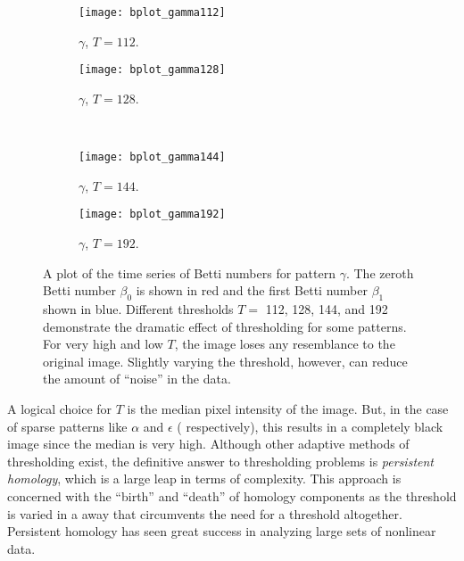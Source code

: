 \begin{figure*}[h]
	\centering
	\begin{subfigure}[b]{0.48\textwidth}
                \texttt{[image: bplot\_gamma112]}
                \caption{$\gamma$, $T = 112$.}
                \label{fig:bplot_gamma112}
        \end{subfigure}
	\begin{subfigure}[b]{0.48\textwidth}
                \texttt{[image: bplot\_gamma128]}
                \caption{$\gamma$, $T = 128$.}
                \label{fig:bplot_gamma128}
        \end{subfigure} \hfill \\
	\begin{subfigure}[b]{0.48\textwidth}
                \texttt{[image: bplot\_gamma144]}
                \caption{$\gamma$, $T = 144$.}
                \label{fig:bplot_gamma144}
       \end{subfigure}
       \begin{subfigure}[b]{0.48\textwidth}
                \texttt{[image: bplot\_gamma192]}
                \caption{$\gamma$, $T = 192$.}
                \label{fig:bplot_gamma192}
        \end{subfigure}
        
        \caption{A plot of the time series of Betti numbers for pattern $\gamma$. The zeroth Betti number $\beta_0$ is shown in red and the first Betti number $\beta_1$ shown in blue. Different thresholds $T =$ 112, 128, 144, and 192 demonstrate the dramatic effect of thresholding for some patterns. For very high and low $T$, the image loses any resemblance to the original image. Slightly varying the threshold, however, can reduce the amount of ``noise'' in the data.} \label{fig:bplots_gamma}
\end{figure*}

A logical choice for $T$ is the median pixel intensity of the image. But, in the case of sparse patterns like $\alpha$ and $\epsilon$ ( respectively), this results in a completely black image since the median is very high. Although other adaptive methods of thresholding exist, the definitive answer to thresholding problems is \emph{persistent homology}, which is a large leap in terms of complexity. This approach is concerned with the ``birth'' and ``death'' of homology components as the threshold is varied in a away that circumvents the need for a threshold altogether. Persistent homology has seen great success in analyzing large sets of nonlinear data.

